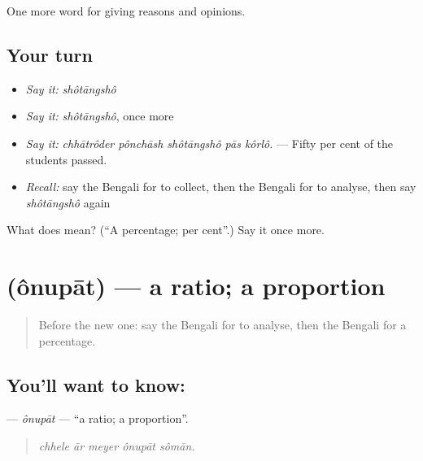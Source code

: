 \begin{grammarlens}[title={What you've built}]
One more word for giving reasons and opinions.
\end{grammarlens}

\subsection*{Your turn}
\begin{itemize}
\raggedright
  \item \emph{Say it:} \emph{shôtāngshô}
  \item \emph{Say it:} \emph{shôtāngshô}, once more
  \item \emph{Say it:} \emph{chhātrôder pônchāsh shôtāngshô pās kôrlô.} — Fifty per cent of the students passed.
  \item \emph{Recall:} say the Bengali for to collect, then the Bengali for to analyse, then say \emph{shôtāngshô} again
\end{itemize}

\begin{tcolorbox}[breakable,colback=teal!4,colframe=teal!35!black,title={Before you move on}]
What does  mean? (\textquotedblleft{}A percentage; per cent\textquotedblright{}.) Say it once more.
\end{tcolorbox}
\section[\texorpdfstring{\bn{অনুপাত} (ônupāt)}{অনুপাত (ônupāt)}]{ (ônupāt) — a ratio; a proportion}

\label{lesson:BN-C356-onupat}



\begin{quote}
Before the new one: say the Bengali for to analyse, then the Bengali for a percentage.
\end{quote}

\subsection*{You'll want to know: }
\textbf{} — \emph{ônupāt} — \textquotedblleft{}a ratio; a proportion\textquotedblright{}.

\begin{quote}
    
\end{quote}

\begin{quote}
\emph{chhele ār meyer ônupāt sômān.}
\end{quote}

